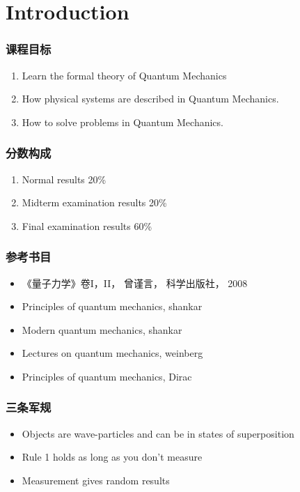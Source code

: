 \section*{Introduction}

\begin{frame}
    \frametitle{课程目标}
        \begin{enumerate}
            \item Learn the formal theory of Quantum Mechanics
            \item How physical systems are described in Quantum Mechanics.
            \item How to solve problems in Quantum Mechanics.
        \end{enumerate}
\end{frame}
\begin{frame}
    \frametitle{分数构成}
        \begin{enumerate}
            \item Normal results 20\%
            \item Midterm examination results 20\%
            \item Final examination results 60\%
        \end{enumerate}
\end{frame}

\begin{frame}
    \frametitle{参考书目}
        \begin{itemize}
            \item 《量子力学》卷I，II， 曾谨言， 科学出版社， 2008           
            \item Principles of quantum mechanics, shankar
            \item Modern quantum mechanics, shankar
            \item Lectures on quantum mechanics, weinberg
            \item Principles of quantum mechanics, Dirac
        \end{itemize}
\end{frame}

\begin{frame}
    \frametitle{三条军规}
        \begin{itemize}
            \item Objects are wave-particles and can be in states of superposition
            \item Rule 1 holds as long as you don't measure
            \item Measurement gives random results
        \end{itemize}
\end{frame}

